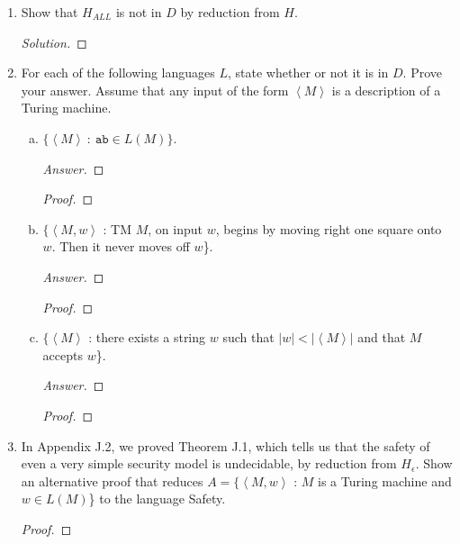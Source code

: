 \documentclass[10pt]{article}
\newcommand{\card}[1]{\left| #1 \right|}
\newcommand{\brackets}[1]{\left< #1 \right>}
\begin{document}
\begin{enumerate}[1)]
\item
Show that $H_{ALL}$ is not in $D$ by reduction from $H$.
\begin{proof}[Solution]
\end{proof}



\item
For each of the following languages $L$, state whether or not it is in $D$.  Prove your answer.  Assume that any input of the form $\brackets{M}$ is a description of a Turing machine.
\begin{enumerate}[a)]

\item
$\{\brackets{M}\ :\ \texttt{ab} \in L(M)\}$.
\begin{proof}[Answer]
\end{proof}
\begin{proof}[Proof]
\end{proof}

\item
$\{\brackets{M, w}$ : TM $M$, on input $w$, begins by moving right one square onto $w$.  Then it never moves off $w$\}.
\begin{proof}[Answer]
\end{proof}
\begin{proof}[Proof]
\end{proof}

\item
$\{\brackets{M}$ : there exists a string $w$ such that $\card{w} < \card{\brackets{M}}$ and that $M$ accepts $w$\}.
\begin{proof}[Answer]
\end{proof}
\begin{proof}[Proof]
\end{proof}
\end{enumerate}


\item
In Appendix J.2, we proved Theorem J.1, which tells us that the safety of even a very simple security model is undecidable, by reduction from $H_\epsilon$.  Show an alternative proof that reduces $A = \{\brackets{M, w}$ :  $M$ is a Turing machine and $w \in L(M)$\} to the language Safety.
\begin{proof}[Proof]
\end{proof}
\end{enumerate}
\end{document}

